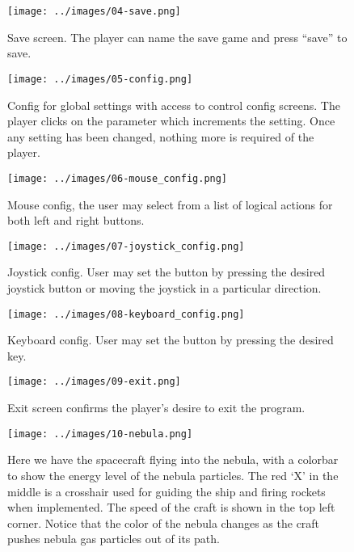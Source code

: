\begin{figure}[H]
  \centering
  \texttt{[image: ../images/04-save.png]}
  \caption{Save screen.  The player can name the save game and press ``save'' to save.}
\end{figure}

\begin{figure}[H]
  \centering
  \texttt{[image: ../images/05-config.png]}
  \caption{Config for global settings with access to control config screens.  The player clicks on the parameter which increments the setting.  Once any setting has been changed, nothing more is required of the player.}
\end{figure}

\begin{figure}[H]
  \centering
  \texttt{[image: ../images/06-mouse\_config.png]}
  \caption{Mouse config, the user may select from a list of logical actions for both left and right buttons.}
\end{figure}

\begin{figure}[H]
  \centering
  \texttt{[image: ../images/07-joystick\_config.png]}
  \caption{Joystick config.  User may set the button by pressing the desired joystick button or moving the joystick in a particular direction.}
\end{figure}

\begin{figure}[H]
  \centering
  \texttt{[image: ../images/08-keyboard\_config.png]}
  \caption{Keyboard config.  User may set the button by pressing the desired key.}
\end{figure}

\begin{figure}[H]
  \centering
  \texttt{[image: ../images/09-exit.png]}
  \caption{Exit screen confirms the player's desire to exit the program.}
\end{figure}

\begin{figure}[H]
  \centering
  \texttt{[image: ../images/10-nebula.png]}
  \caption{Here we have the spacecraft flying into the nebula, with a colorbar to show the energy level of the nebula particles.  The red `X' in the middle is a crosshair used for guiding the ship and firing rockets when implemented.  The speed of the craft is shown in the top left corner.  Notice that the color of the nebula changes as the craft pushes nebula gas particles out of its path.}
\end{figure}

